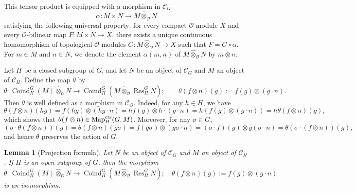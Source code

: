 \documentclass{article}
\numberwithin{equation}{section} %
\newtheorem{lemm}{Lemma}[section]
\begin{document}
This tensor product is equipped with a morphism in $\mathscr{C}_G$
\[
  \alpha: M \times N \longrightarrow M \widehat{\otimes}_{\mathcal{O}} N
\]
satisfying the following universal property: for every compact $\mathcal{O}$-module $X$ and every $\mathcal{O}$-bilinear map $F: M \times N \to X$, there exists a unique continuous homomorphism of topological $\mathcal{O}$-modules $G: M \widehat{\otimes}_{\mathcal{O}} N \to X$ such that $F = G \circ \alpha$. For $m\in M$ and $n\in N$, we denote the element $\alpha(m,n)$ of $M \widehat{\otimes}_{\mathcal{O}} N$ by $m\otimes n$.

Let $H$ be a closed subgroup of $G$, and let $N$ be an object of $\mathscr{C}_G$ and $M$ an object of $\mathscr{C}_H$. Define the map $\theta$ by
\[
  \theta:
  \operatorname{Coind}_H^G(M)\widehat{\otimes}_{\mathcal{O}} N
  \longrightarrow
  \operatorname{Coind}_H^G
  (M\widehat{\otimes}_{\mathcal{O}}\operatorname{Res}_H^G N);
  \qquad
  \theta(f\otimes n)(g)
  :=
  f(g)\otimes (g\cdot n).
\]
Then $\theta$ is well defined as a morphism in $\mathscr{C}_G$. 
Indeed, for any $h\in H$, we have
\[
  \theta(f\otimes n)(hg)
  =
  f(hg)\otimes (hg\cdot n)
  =
  hf(g)\otimes h\cdot(g\cdot n)
  =
  h(f(g)\otimes (g\cdot n))
  =
  h\theta(f\otimes n)(g),
\]
which shows that $\theta(f\otimes n)\in \operatorname{Map}_H^{\rm cts}(G,M)$. Moreover, for any $\sigma\in G$,
\[
  \left(\sigma\cdot \theta(f\otimes n)\right)(g)
  =
  \theta(f\otimes n)(g\sigma)
  =
  f(g\sigma)\otimes (g\sigma\cdot n)
  =
  (\sigma\cdot f)(g)\otimes g(\sigma\cdot n)
  =
  \theta(\sigma\cdot(f\otimes n))(g),
\]
and hence $\theta$ preserves the action of $G$.
\fi

    \begin{lemm}[Projection formula]
        \label{gtjwi4tjmo3tji4ot}
      Let $N$ be an object of $\mathscr{C}_G$ and $M$ an object of $\mathscr{C}_H$. If $H$ is an open subgroup of $G$, then the morphism
    \[
      \theta: \operatorname{Coind}_H^G(M) \widehat{\otimes}_{\mathcal{O}} N \longrightarrow \operatorname{Coind}_H^G(M \widehat{\otimes}_{\mathcal{O}}\operatorname{Res}_H^G N); \quad \theta(f\otimes n)(g) := f(g) \otimes (g \cdot n)
    \]
      is an isomorphism.
    \end{lemm}
\end{document}
